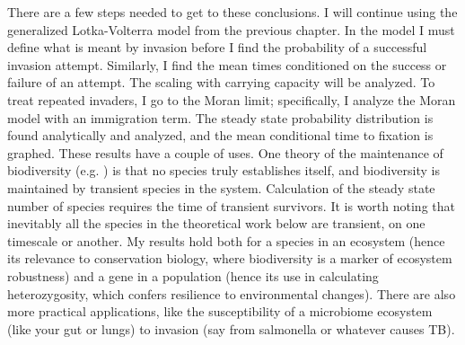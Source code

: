 There are a few steps needed to get to these conclusions. 
I will continue using the generalized Lotka-Volterra model from the previous chapter. %
In the model I must define what is meant by invasion before I find the probability of a successful invasion attempt. 
Similarly, I find the mean times conditioned on the success or failure of an attempt. The scaling with carrying capacity will be analyzed. 
To treat repeated invaders, I go to the Moran limit; specifically, I analyze the Moran model with an immigration term. 
The steady state probability distribution is found analytically and analyzed, and the mean conditional time to fixation is graphed. 
These results have a couple of uses. 
One theory of the maintenance of biodiversity (e.g. \cite{Hubbell2001}) is that no species truly establishes itself, and biodiversity is maintained by transient species in the system. 
Calculation of the steady state number of species requires the time of transient survivors. 
It is worth noting that inevitably all the species in the theoretical work below are transient, on one timescale or another. 
My results hold both for a species in an ecosystem (hence its relevance to conservation biology, where biodiversity is a marker of ecosystem robustness) and a gene in a population (hence its use in calculating heterozygosity, which confers resilience to environmental changes). 
There are also more practical applications, like the susceptibility of a microbiome ecosystem (like your gut or lungs) to invasion (say from salmonella or whatever causes TB). %

\iffalse
Transient co-existence during the fixation/extinction process of immigrants/mutants has also been proposed as a mechanism for observed biodiversity in a number of contexts \cite{Kimura1964,Dias1996,Hubbell2001,Chesson2000,Leibold2006,Kessler2015,Vega2017}. 
The extent of this biodiversity is constrained by the interplay between the residence times of these invaders and the rate at which they appear in a settled population. 
In the previous sections we calculated the fixation times in the two species system starting from the deterministically stable fixed point. 
In this section we investigate the complementary problem of robustness of a stable population of one species with respect to an invasion of another species, arising either through mutation or immigration, and investigate the effect of niche overlap and system size on the probability and mean times of successful and failed invasions. 
\fi


